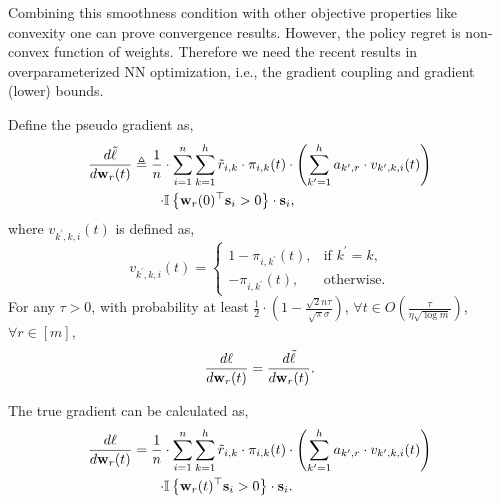 Combining this smoothness condition with other objective properties like convexity one can prove convergence results. However, the policy regret is non-convex function of weights. Therefore we need the recent results in overparameterized NN optimization, i.e., the gradient coupling and gradient (lower) bounds.

\begin{lem}
\label{lem:gradient_coupling}
	Define the pseudo gradient as,
\begin{equation*}
\begin{split}
	\frac{d \tilde{\ell}}{d {\mathbf{w}}_r(t)} &\triangleq \frac{1}{n} \cdot \sum\limits_{i=1}^{n}{ \sum\limits_{k=1}^{h}{ \tilde{r}_{i,k} \cdot \pi_{i,k}(t) \cdot \left( \sum\limits_{k^\prime = 1}^{h}{ a_{k^\prime,r}  \cdot v_{k^\prime,k,i}(t) } \right) } } \\
	&\qquad { { \cdot {\mathbb{I}}\left\{ {\mathbf{w}}_r(0)^\top {\mathbf{s}}_i > 0 \right\} \cdot {\mathbf{s}}_i } },
\end{split}
\end{equation*}
where $v_{k^\prime,k,i}(t)$ is defined as,
\begin{equation*}
	v_{k^\prime,k,i}(t) = \begin{cases}
    1 - \pi_{i,k^\prime}(t), & \text{if $k^\prime = k$}, \\
    - \pi_{i,k^\prime}(t), & \text{otherwise}.
  \end{cases}
\end{equation*}
	For any $\tau > 0$, with probability at least $\frac{1}{2} \cdot \left( 1 - \frac{\sqrt{2}n\tau}{\sqrt{\pi}\sigma} \right)$, $\forall t \in O\left(\frac{\tau}{\eta  \sqrt{\log{m}}}\right)$, $\forall r \in [m]$,
\begin{equation}
	\frac{d\ell}{d {\mathbf{w}}_r(t)} = \frac{d \tilde{\ell}}{d {\mathbf{w}}_r(t)}.
\end{equation}
\end{lem}

The true gradient can be calculated as,
\begin{equation*}
\begin{split}
    \frac{d\ell}{d {\mathbf{w}}_r(t)} &= \frac{1}{n} \cdot \sum\limits_{i=1}^{n}{ \sum\limits_{k=1}^{h}{  \tilde{r}_{i,k} \cdot \pi_{i,k}(t) \cdot \left( \sum\limits_{k^\prime = 1}^{h}{ a_{k^\prime,r}  \cdot v_{k^\prime,k,i}(t) } \right) }} \\
    &\qquad  {{ \cdot {\mathbb{I}}\left\{ {\mathbf{w}}_r(t)^\top {\mathbf{s}}_i > 0 \right\} \cdot {\mathbf{s}}_i } }.
\end{split}
\end{equation*}

